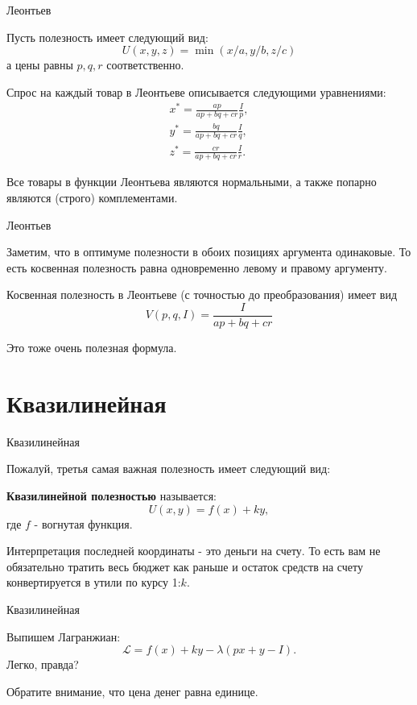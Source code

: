 \documentclass{beamer}
\begin{document}
\begin{frame}{Леонтьев}

Пусть полезность имеет следующий вид:
$$U(x,y,z) = \min(x/a, y/b, z/c)$$ 
а цены равны $p, q, r$ соответственно. 

Спрос на каждый товар в Леонтьеве описывается следующими уравнениями:
\begin{gather*}
x^{\ast} = \frac{ap}{ap + bq + cr} \frac{I}{p}, \\
y^{\ast} = \frac{bq}{ap + bq + cr} \frac{I}{q}, \\
z^{\ast} = \frac{cr}{ap + bq + cr} \frac{I}{r}.
\end{gather*}

Все товары в функции Леонтьева являются нормальными, а также попарно являются (строго) комплементами.

\end{frame}

\begin{frame}{Леонтьев}

Заметим, что в оптимуме полезности в обоих позициях аргумента одинаковые. То есть косвенная полезность равна одновременно левому и правому аргументу.


Косвенная полезность в Леонтьеве (с точностью до преобразования) имеет вид
$$V(p,q,I) = \frac{I}{ap + bq + cr}$$

Это тоже очень полезная формула.

\end{frame}

\section{Квазилинейная}

\begin{frame}{Квазилинейная}

Пожалуй, третья самая важная полезность имеет следующий вид:

\begin{definition}
\textbf{Квазилинейной полезностью} называется:
$$U(x, y) = f(x) + k y,$$ 
где $f$ - вогнутая функция.
\end{definition}

Интерпретация последней координаты - это деньги на счету. То есть вам не обязательно тратить весь бюджет как раньше и остаток средств на счету конвертируется в утили по курсу 1:$k$.

\end{frame}

\begin{frame}{Квазилинейная}

Выпишем Лагранжиан:
$$\mathcal{L} = f(x) + k y - \lambda (px + y - I).$$ 
Легко, правда?

Обратите внимание, что цена денег равна единице.

\end{frame}
\end{document}
